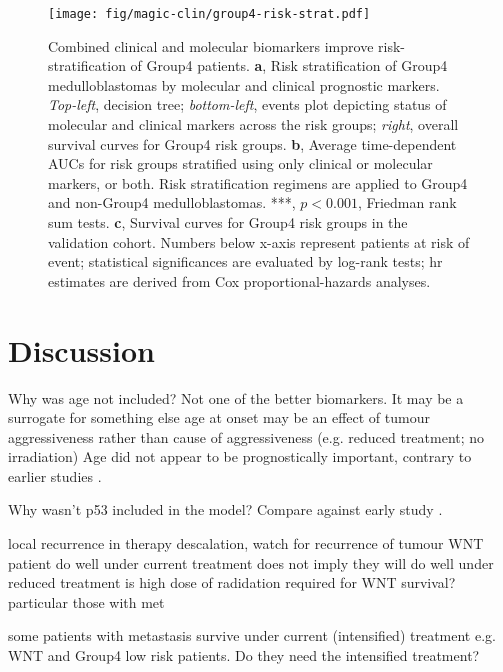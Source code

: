 \clearpage

\begin{figure}[h]
	\begin{center}
		\texttt{[image: fig/magic-clin/group4-risk-strat.pdf]}
	\end{center}
	\caption[Combined clinical and molecular biomarkers improve risk-stratification of Group4 patients]
	{Combined clinical and molecular biomarkers improve risk-stratification of Group4 patients.
	\textbf{a}, Risk stratification of Group4 medulloblastomas by molecular and clinical prognostic markers. \emph{Top-left}, decision tree; \emph{bottom-left}, events plot depicting status of molecular and clinical markers across the risk groups; \emph{right}, overall survival curves for Group4 risk groups.
	\textbf{b}, Average time-dependent AUCs for risk groups stratified using only clinical or molecular markers, or both. Risk stratification regimens are applied to Group4 and non-Group4 medulloblastomas. ***, $p < 0.001$, Friedman rank sum tests.
	\textbf{c}, Survival curves for Group4 risk groups in the validation cohort. 
	Numbers below x-axis represent patients at risk of event; statistical significances are evaluated by log-rank tests; \gls{hr} estimates are derived from Cox proportional-hazards analyses.
	}
	\label{fig:group4-risk-strat}
\end{figure}

\clearpage


\section{Discussion}

Why was age not included?
Not one of the better biomarkers. It may be a surrogate for something else
age at onset may be an effect of tumour aggressiveness rather than cause of aggressiveness (e.g. reduced treatment; no irradiation)
Age did not appear to be prognostically important, contrary to earlier studies .

Why wasn't p53 included in the model? Compare against early study .

local recurrence in therapy descalation, watch for recurrence of tumour
WNT patient do well under current treatment
does not imply they will do well under reduced treatment
is high dose of radidation required for WNT survival? particular those with met

some patients with metastasis survive under current (intensified) treatment
e.g. WNT and Group4 low risk patients. Do they need the intensified treatment?


